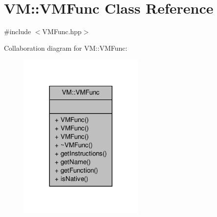 \hypertarget{class_v_m_1_1_v_m_func}{\section{V\-M\-:\-:V\-M\-Func Class Reference}
\label{class_v_m_1_1_v_m_func}
}


{\ttfamily \#include $<$V\-M\-Func.\-hpp$>$}



Collaboration diagram for V\-M\-:\-:V\-M\-Func\-:
\nopagebreak
\begin{figure}[H]
\begin{center}
\leavevmode
\includegraphics[width=176pt]{class_v_m_1_1_v_m_func__coll__graph}
\end{center}
\end{figure}
